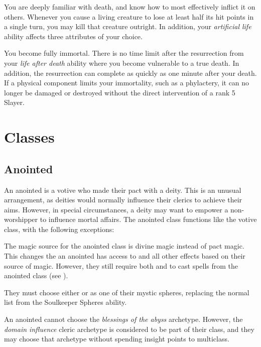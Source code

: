        You are deeply familiar with death, and know how to most effectively inflict it on others.
      Whenever you cause a living creature to lose at least half its hit points in a single turn, you may kill that creature outright.
      In addition, your \textit{artificial life} ability affects three attributes of your choice.

       You become fully immortal. There is no time limit after the resurrection from your \textit{life after death} ability where you become vulnerable to a true death. In addition, the resurrection can complete as quickly as one minute after your death. If a physical component limits your immortality, such as a phylactery, it can no longer be damaged or destroyed without the direct intervention of a rank 5 Slayer.

\section{Classes}
  \subsection{Anointed}
    An anointed is a votive who made their pact with a deity.
    This is an unusual arrangement, as deities would normally influence their clerics to achieve their aims.
    However, in special circumstances, a deity may want to empower a non-worshipper to influence mortal affairs.
    The anointed class functions like the votive class, with the following exceptions:
    \begin{raggeditemize}
      \item The magic source for the anointed class is divine magic instead of pact magic.
        This changes the  an anointed has access to and all other effects based on their source of magic.
        However, they still require both  and  to cast spells from the anointed class (see ).
      \item They must choose either  or  as one of their mystic spheres, replacing the normal list from the Soulkeeper Spheres ability.
      \item An anointed cannot choose the \textit{blessings of the abyss} archetype. However, the \textit{domain influence} cleric archetype is considered to be part of their class, and they may choose that archetype without spending insight points to multiclass.
    \end{raggeditemize}

